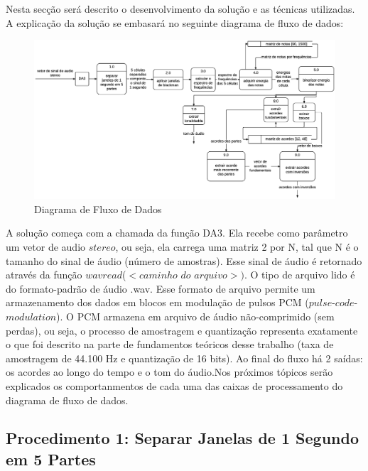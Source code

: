 Nesta secção será descrito o desenvolvimento da solução e as técnicas utilizadas. A explicação da solução se embasará no seguinte diagrama de fluxo de dados:

\begin{figure}[h]
	\centering
		\includegraphics[keepaspectratio=true,scale=0.51]{figuras/dfd_2.eps}
	\caption{Diagrama de Fluxo de Dados}
\end{figure}

A solução começa com a chamada da função DA3. Ela recebe como parâmetro um vetor de audio $stereo$, ou seja, ela carrega uma matriz 2 por N, tal que N é o tamanho do sinal de áudio (número de amostras). Esse sinal de áudio é retornado através da função $wavread$($<$$caminho$ $do$ $arquivo$$>$$)$. O tipo de arquivo lido é do formato-padrão de áudio .wav. Esse formato de arquivo permite um armazenamento dos dados em blocos em modulação de pulsos PCM ($pulse$-$code$-$modulation$). O PCM armazena em arquivo de áudio não-comprimido (sem perdas), ou seja, o processo de amostragem e quantização representa exatamente o que foi descrito na parte de fundamentos teóricos desse trabalho (taxa de amostragem de 44.100 Hz e quantização de 16 bits). Ao final do fluxo há 2 saídas: os acordes ao longo do tempo e o tom do áudio.Nos próximos tópicos serão explicados os comportanmentos de cada uma das caixas de processamento do diagrama de fluxo de dados.

\subsection{Procedimento 1: Separar Janelas de 1 Segundo em 5 Partes}
\label{sec:janelas}


